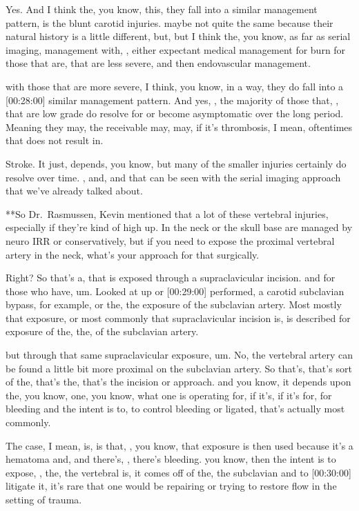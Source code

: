 \documentclass[
]{book}
\begin{document}
Yes. And I
think the, you know, this, they fall into a similar management pattern,
is the blunt carotid injuries. maybe not quite the same because
their natural history is a little different, but, but I think the, you
know, as far as serial imaging, management with, , either expectant
medical management for burn for those that are, that are less severe,
and then endovascular management.

with those that are more severe, I think, you know, in a way, they
do fall into a {[}00:28:00{]} similar management pattern. And yes, , the
majority of those that, , that are low grade do resolve for or become
asymptomatic over the long period. Meaning they may, the receivable may,
may, if it's thrombosis, I mean, oftentimes that does not result in.

Stroke. It just, depends, you know, but many of the smaller injuries
certainly do resolve over time. , and, and that can be seen with the
serial imaging approach that we've already talked about.

**So Dr.~Rasmussen, Kevin
mentioned that a lot of these vertebral injuries, especially if they're
kind of high up. In the neck or the skull base are managed by neuro IRR
or conservatively, but if you need to expose the proximal vertebral
artery in the neck, what's your approach for that surgically.

Right? So
that's a, that is exposed through a supraclavicular incision. and
for those who have, um. Looked at up or {[}00:29:00{]} performed, a
carotid subclavian bypass, for example, or the, the exposure of the
subclavian artery. Most mostly that exposure, or most commonly that
supraclavicular incision is, is described for exposure of the, the, of
the subclavian artery.

but through that same supraclavicular exposure, um. No, the
vertebral artery can be found a little bit more proximal on the
subclavian artery. So that's, that's sort of the, that's the, that's the
incision or approach. and you know, it depends upon the, you know,
one, you know, what one is operating for, if it's, if it's for, for
bleeding and the intent is to, to control bleeding or ligated, that's
actually most commonly.

The case, I mean, is, is that, , you know, that exposure is then used
because it's a hematoma and, and there's, , there's bleeding. you
know, then the intent is to expose, , the, the vertebral is, it
comes off of the, the subclavian and to {[}00:30:00{]} litigate it, it's
rare that one would be repairing or trying to restore flow in the
setting of trauma.
\end{document}

